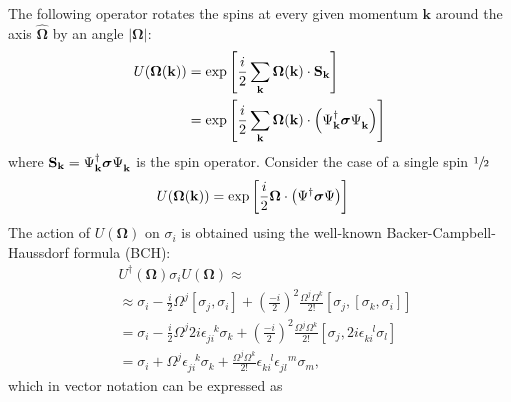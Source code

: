 \documentclass[english,aps,prd,nofootinbib,twocolumn]{revtex4-1}
\begin{document}
The following operator rotates the spins at every given momentum $\mathbf{k}$ around the axis $\hat{\boldsymbol{\Omega}}$ by an angle $|\boldsymbol{\Omega}|$:
\begin{equation}
\begin{split}
U(\boldsymbol{\Omega}(\mathbf{k})) &= 
\exp \left[
\frac{i}{2} \sum_{\mathbf{k}}
\boldsymbol{\Omega}(\mathbf{k}) \cdot 
\mathbf{S}_{\mathbf{k}}
\right] \\ &= 
\exp \left[
\frac{i}{2} \sum_{\mathbf{k}}
\boldsymbol{\Omega}(\mathbf{k}) \cdot 
\left(
\Psi_{\mathbf{k}}^{\textcolor{black}{\dagger}}
\boldsymbol{\sigma}
\Psi_{\mathbf{k}}^{\textcolor{white}{\dagger}}
\right)
\right]
\end{split}
\end{equation}
where $\mathbf{S}_{\mathbf{k}} = \Psi_{\mathbf{k}}^{\textcolor{black}{\dagger}}
\boldsymbol{\sigma}
\Psi_{\mathbf{k}}^{\textcolor{white}{\dagger}}$ is the spin operator. 
Consider the case of a single spin $\sfrac{1}{2}$
\begin{equation}
\begin{split}
U(\boldsymbol{\Omega}(\mathbf{k})) &= 
\exp \left[
\frac{i}{2} 
\boldsymbol{\Omega} \cdot 
\left(
\Psi^{\textcolor{black}{\dagger}}
\boldsymbol{\sigma}
\Psi%
\right)
\right]
\end{split}
\end{equation}
The action of $U(\boldsymbol{\Omega})$ on $\sigma_{i}$ is obtained using the well-known Backer-Campbell-Haussdorf formula (BCH):
\begin{equation}
\begin{split}
&U^{\dagger}(\boldsymbol{\Omega})
\sigma_{i}
U(\boldsymbol{\Omega}) \approx \\ &\approx 
\sigma_{i} - \frac{i}{2}\Omega^{j}
\left[ \sigma_{j},\sigma_{i} \right]
+ \left(\frac{-i}{2}\right)^{2}
\frac{\Omega^{j}\Omega^{k}}{2!}
\left[ \sigma_{j},\left[ \sigma_{k},\sigma_{i} \right] \right] \\ &= 
\sigma_{i} - \frac{i}{2}\Omega^{j}
2i\epsilon_{ji}^{\;\;\,k}\sigma_{k}
+ \left(\frac{-i}{2}\right)^{2}
\frac{\Omega^{j}\Omega^{k}}{2!}
\left[ \sigma_{j},2i\epsilon_{ki}^{\;\;\;l}\sigma_{l} \right] \\ &= 
\sigma_{i} + \Omega^{j}
\epsilon_{ji}^{\;\;\,k}\sigma_{k}
+ 
\frac{\Omega^{j}\Omega^{k}}{2!}
\epsilon_{ki}^{\;\;\;l}\epsilon_{jl}^{\;\;\;m}\sigma_{m},
\end{split}
\end{equation}
which in vector notation can be expressed as
\end{document}
